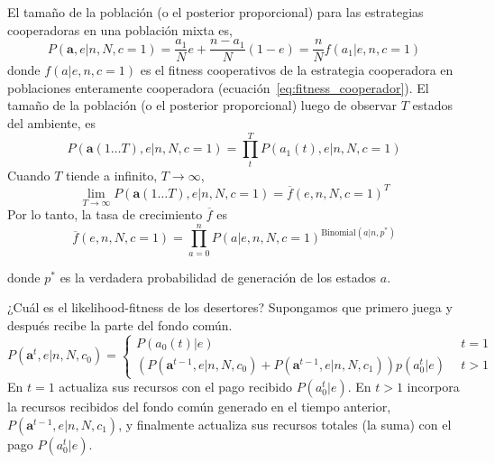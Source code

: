 \documentclass[a4paper,10pt]{article}
\begin{document}
El tamaño de la población (o el posterior proporcional) para las estrategias cooperadoras en una población mixta es, 
%
\begin{equation}
P(\bm{a},e|n,N,c=1) = \frac{a_1}{N} e + \frac{n-a_1}{N}(1-e) = \frac{n}{N} f(a_1|e,n,c=1)
\end{equation}
donde $f(a|e,n,c=1)$ es el fitness cooperativos de la estrategia cooperadora en poblaciones enteramente cooperadora (ecuación~\ref{eq:fitness_cooperador}).
El tamaño de la población (o el posterior proporcional) luego de observar $T$ estados del ambiente, es
%
\begin{equation}
P(\bm{a}(1 \dots T),e|n,N,c=1) = \prod^T_t P(a_1(t),e|n,N,c=1)
\end{equation}
%
Cuando $T$ tiende a infinito, $T \rightarrow \infty$,
\begin{equation}
\lim_{T \rightarrow \infty}P(\bm{a}(1 \dots T),e|n,N,c=1) = \overline{f}(e,n,N,c=1)^T
\end{equation}
Por lo tanto, la tasa de crecimiento $\overline{f}$ es
\begin{equation} \label{eq:coop_temporal_average}
\overline{f}(e,n,N,c=1) = \prod_{a=0}^n P(a|e,n,N,c=1)^{\text{Binomial}(a|n,p^*)}
\end{equation}

%
donde $p^*$ es la verdadera probabilidad de generación de los estados $a$.
% 


¿Cuál es el likelihood-fitness de los desertores?
Supongamos que primero juega y después recibe la parte del fondo común.
\begin{equation}
P(\bm{a}^t,e|n,N, c_0) =
\begin{cases}
 P(a_0(t)|e) & \ \  t=1 \\
 (P(\bm{a}^{t-1},e|n,N,c_0) + P(\bm{a}^{t-1}, e|n,N,c_1)) p(a_0^t|e) & \ \  t>1
\end{cases}
\end{equation}
En $t=1$ actualiza sus recursos con el pago recibido $P(a_0^t|e)$.
En $t>1$ incorpora la recursos recibidos del fondo común generado en el tiempo anterior, $ P(\bm{a}^{t-1}, e|n,N,c_1)$, y finalmente actualiza sus recursos totales (la suma) con el pago $P(a_0^t|e)$.
\end{document}
